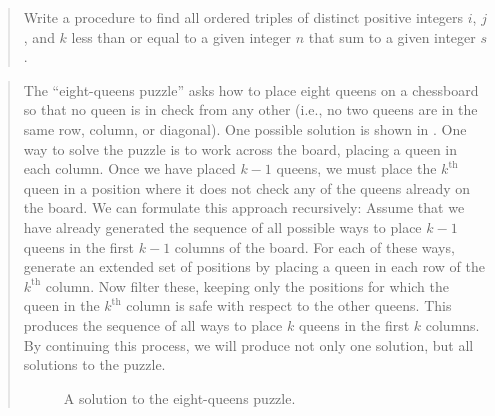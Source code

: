 \begin{quote}
 Write a procedure to find all
ordered triples of distinct positive integers \( i \), \( j \), and \( k \) less than
or equal to a given integer \( n \) that sum to a given integer \( s \).
\end{quote}

\begin{quote}
 The ``eight-queens puzzle'' asks
how to place eight queens on a chessboard so that no queen is in check from any
other (i.e., no two queens are in the same row, column, or diagonal).  One
possible solution is shown in .  One way to solve the puzzle is
to work across the board, placing a queen in each column.  Once we have placed
\( k - 1 \) queens, we must place the \( k^{\mathrm{th}} \) queen in a position where it does
not check any of the queens already on the board.  We can formulate this
approach recursively: Assume that we have already generated the sequence of all
possible ways to place \( k - 1 \) queens in the first \( k - 1 \) columns of the
board.  For each of these ways, generate an extended set of positions by
placing a queen in each row of the \( k^{\mathrm{th}} \) column.  Now filter these, keeping
only the positions for which the queen in the \( k^{\mathrm{th}} \) column is safe with
respect to the other queens.  This produces the sequence of all ways to place
\( k \) queens in the first \( k \) columns.  By continuing this process, we will
produce not only one solution, but all solutions to the puzzle.

\begin{figure}[tb]
\label{Figure 2.8}
\centering

\par\bigskip
\noindent
{} A solution to the eight-queens puzzle.
\end{figure}


\end{quote}
